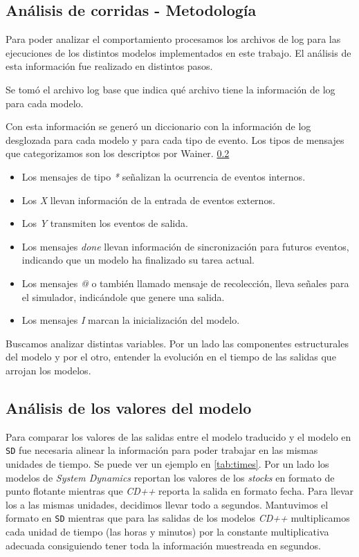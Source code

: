 
\subsection{Análisis de corridas - Metodología}

Para poder analizar el comportamiento procesamos los archivos de log para las ejecuciones de los distintos modelos implementados en este trabajo.
El análisis de esta información fue realizado en distintos pasos.

Se tomó el archivo log base que indica qué archivo tiene la información de log para cada modelo.

Con esta información se generó un diccionario con la información de log desglozada para cada modelo y para cada tipo de evento. Los tipos de mensajes que categorizamos son los descriptos por Wainer. \ref{}

\begin{itemize}
    \item Los mensajes de tipo \textit{*} señalizan la ocurrencia de eventos internos.
    \item Los \textit{X} llevan información de la entrada de eventos externos.
    \item Los \textit{Y} transmiten los eventos de salida.
    \item Los mensajes \textit{done} llevan información de sincronización para futuros eventos, indicando que un modelo ha finalizado su tarea actual.
    \item Los mensajes  \textit{@} o también llamado mensaje de recolección,
        lleva señales para el simulador, indicándole que genere una salida.
    \item Los mensajes \textit{I} marcan la inicialización del modelo.
\end{itemize}

Buscamos analizar distintas variables. Por un lado las componentes
estructurales del modelo y por el otro, entender la evolución en el tiempo de
las salidas que arrojan los modelos.


\subsection{Análisis de los valores del modelo}

Para comparar los valores de las salidas entre el modelo traducido y el modelo
en \texttt{SD} fue necesaria alinear la información para poder trabajar en las
mismas unidades de tiempo. Se puede ver un ejemplo en \ref{tab:times}. Por un lado los modelos de \textit{System Dynamics} reportan
los valores de los \textit{stocks} en formato de punto flotante mientras que \textit{CD++}
reporta la salida en formato fecha. Para llevar los a las mismas unidades,
decidimos llevar todo a segundos. Mantuvimos el formato en \texttt{SD} mientras que para las salidas de los modelos \textit{CD++} multiplicamos cada unidad de tiempo (las horas y minutos) por la constante multiplicativa adecuada consiguiendo tener toda la información muestreada en segundos.

